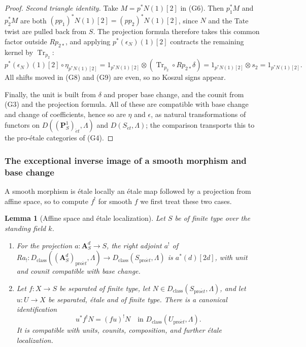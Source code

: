 \documentclass[11pt,a4paper]{article}
\numberwithin{equation}{section}
\newtheorem{lemma}[theorem]{Lemma}
\theoremstyle{definition}
\theoremstyle{remark}
\newcommand{\et}{\acute{e}t}
\newcommand{\proet}{\mathrm{pro}\acute{e}t}
\begin{document}
\begin{proof}
\emph{Second triangle identity.} Take \(M=p^*N(1)[2]\) in (G6). Then
\(p_1^*M\) and \(p_2^*M\) are both \((pp_1)^*N(1)[2]=(pp_2)^*N(1)[2]\),
since \(N\) and the Tate twist are pulled back from \(S\). The
projection formula therefore takes this common factor outside
\(Rp_{2*}\), and applying \(p^*(\epsilon_N)(1)[2]\) contracts the
remaining kernel by \(\operatorname{Tr}_{p_2}\):
\[
 p^*(\epsilon_N)(1)[2]\circ\eta_{p^*N(1)[2]}
      =1_{p^*N(1)[2]}\otimes
          (\operatorname{Tr}_{p_2}\circ Rp_{2*}\delta)
      =1_{p^*N(1)[2]}\otimes s_2=1_{p^*N(1)[2]}.                         \tag{G9}
\]
All shifts moved in (G8) and (G9) are even, so no Koszul signs appear.

Finally, the unit is built from \(\delta\) and proper base change, and
the counit from (G3) and the projection formula. All of these are
compatible with base change and change of coefficients, hence so are
\(\eta\) and \(\epsilon\), as natural transformations of functors on
\(D((\mathbf P^1_S)_{\et},\Lambda)\) and \(D(S_{\et},\Lambda)\); the
comparison transports this to the pro-\'etale categories of (G4).
\end{proof}

\subsubsection{The exceptional inverse image of a smooth morphism and base change}

A smooth morphism is \'etale locally an \'etale map followed by a
projection from affine space, so to compute \(f^!\) for smooth \(f\) we
first treat these two cases.

\begin{lemma}[Affine space and \'etale localization]
\label{b:lem:geo-affine-local}
Let \(S\) be of finite type over the standing field \(k\).
\begin{enumerate}
\item For the projection \(a:\mathbf A^d_S\to S\), the right adjoint
\(a^!\) of \(Ra_!\colon D_{\mathrm{class}}((\mathbf A^d_S)_{\proet},\Lambda)
\to D_{\mathrm{class}}(S_{\proet},\Lambda)\) is \(a^*(d)[2d]\), with unit and counit compatible
with base change.
\item Let \(f:X\to S\) be separated of finite type, let
\(N\in D_{\mathrm{class}}(S_{\proet},\Lambda)\), and let \(u:U\to X\) be separated, \'etale
and of finite type. There is a canonical identification
\[
 u^*f^!N=(fu)^!N\quad\text{in }D_{\mathrm{class}}(U_{\proet},\Lambda).
                                                               \tag{G10}
\]
It is compatible with units, counits, composition, and further
\'etale localization.
\end{enumerate}
\end{lemma}
\end{document}
